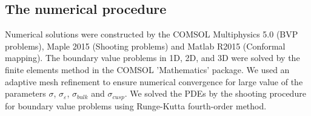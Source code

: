 \documentclass[12pt]{article}
\newcommand{\beq}{\begin{eqnarray}}
\newcommand{\eeq}{\end{eqnarray}}
\newcommand{\p}{\partial}
\newcommand{\eps}{\varepsilon}
\begin{document}
{%
\subsection{The numerical procedure}
Numerical solutions were constructed by the COMSOL Multiphysics 5.0 (BVP problems), Maple 2015 (Shooting problems) and Matlab R2015 (Conformal mapping). The boundary value problems in 1D, 2D, and 3D were solved by the finite elements method in the COMSOL 'Mathematics' package. We used an adaptive mesh refinement to ensure numerical convergence for large value of the parameters $\sigma$, $\sigma_{\eps}$, $\sigma_{bulk}$ and $\sigma_{cusp}$.
We solved the PDEs by the shooting procedure for boundary value problems using Runge-Kutta fourth-order  method.

}
\end{document}

